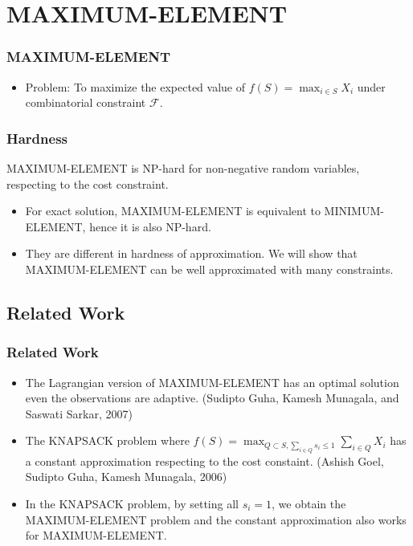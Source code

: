 \documentclass[serif,envcountsect]{beamer}
\newcommand{\calF}{{\mathcal F}}
\begin{document}
\section{MAXIMUM-ELEMENT}
\begin{frame}\frametitle{MAXIMUM-ELEMENT}
\begin{itemize}
\item Problem: To maximize the expected value of $f(S) = \max_{i\in S} X_i$ under combinatorial constraint $\calF$.
\end{itemize}
\end{frame}

\begin{frame}\frametitle{Hardness}
\begin{theorem}
MAXIMUM-ELEMENT is NP-hard for non-negative random variables, respecting to the cost constraint.
\end{theorem}
\begin{itemize}
\item For exact solution, MAXIMUM-ELEMENT is equivalent to MINIMUM-ELEMENT, hence it is also NP-hard.
\item They are different in hardness of approximation. We will show that MAXIMUM-ELEMENT can be well approximated with many constraints.
\end{itemize}
\end{frame}

\subsection{Related Work}

\begin{frame}\frametitle{Related Work}
\begin{itemize}
\item The Lagrangian version of MAXIMUM-ELEMENT has an optimal solution even the observations are adaptive. (Sudipto Guha, Kamesh Munagala, and Saswati Sarkar, 2007) 
\item The KNAPSACK problem where $f(S) = \max_{Q\subset S,\sum_{i\in Q} s_i \leq 1}\sum_{i\in Q} X_i$ has a constant approximation respecting to the cost constaint. (Ashish Goel, Sudipto Guha, Kamesh Munagala, 2006) 
\item In the KNAPSACK problem, by setting all $s_i = 1$, we obtain the MAXIMUM-ELEMENT problem and the constant approximation also works for MAXIMUM-ELEMENT.
\end{itemize}
\end{frame}
\end{document}
